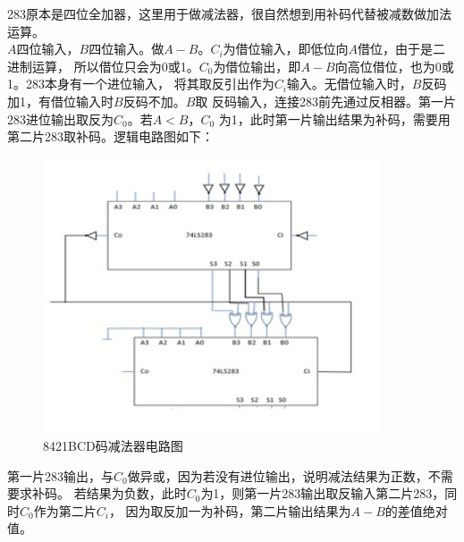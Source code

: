 \documentclass[a4paper,11pt,UTF8]{ctexart}
\begin{document}
 283原本是四位全加器，这里用于做减法器，很自然想到用补码代替被减数做加法运算。\\
 $A$四位输入，$B$四位输入。做$A-B$。$C_i$为借位输入，即低位向$A$借位，由于是二进制运算，
 所以借位只会为0或1。$C_0$为借位输出，即$A-B$向高位借位，也为0或1。283本身有一个进位输入，
 将其取反引出作为$C_i$输入。无借位输入时，$B$反码加1，有借位输入时$B$反码不加。$B$取
 反码输入，连接283前先通过反相器。第一片283进位输出取反为$C_0$。若$A<B$，$C_0$
 为1，此时第一片输出结果为补码，需要用第二片283取补码。逻辑电路图如下：
 \begin{figure}[H]
  \centering
  \includegraphics[width=10cm]{jfqpic13}
  \caption{8421BCD码减法器电路图}
  \label{fig:jfqpic13}
 \end{figure}
 \newpage
 第一片283输出，与$C_0$做异或，因为若没有进位输出，说明减法结果为正数，不需要求补码。
 若结果为负数，此时$C_0$为1，则第一片283输出取反输入第二片283，同时$C_0$作为第二片$C_i$，
 因为取反加一为补码，第二片输出结果为$A-B$的差值绝对值。
\end{document}
